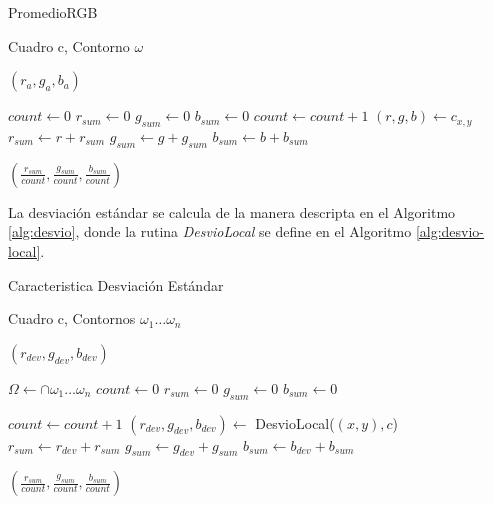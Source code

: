 \begin{algorithm}
    \caption{PromedioRGB}
    \label{alg:carac-rgb}
    \begin{algorithmic}
    \Require\hspace{\algorithmicindent}\hspace{\algorithmicindent}Cuadro c, Contorno $\omega$

    \Ensure\hspace{\algorithmicindent}\hspace{0.23cm} $(r_a, g_a, b_a)$
    \State

    \State $count \gets 0$
    \State $r_{sum} \gets 0$
    \State $g_{sum} \gets 0$
    \State $b_{sum} \gets 0$
        \State $count \gets count + 1$
        \State $(r, g, b) \gets c_{x, y}$
        \State $r_{sum} \gets r + r_{sum}$
        \State $g_{sum} \gets g + g_{sum}$
        \State $b_{sum} \gets b + b_{sum}$
    \EndFor

    \State \Return $ (\frac{r_{sum}}{count}, \frac{g_{sum}}{count}, \frac{b_{sum}}{count}) $
    \end{algorithmic}
\end{algorithm}


La desviación estándar se calcula de la manera descripta en el Algoritmo \ref{alg:desvio}, 
donde la rutina \textit{DesvioLocal} se define en el Algoritmo \ref{alg:desvio-local}.

\begin{algorithm}
    \caption{Caracteristica Desviación Estándar}
    \label{alg:desvio}
    \begin{algorithmic}
    \Require\hspace{\algorithmicindent}\hspace{\algorithmicindent}Cuadro c, Contornos $\omega_1 \dots \omega_n$

    \Ensure\hspace{\algorithmicindent}\hspace{0.23cm} $(r_{dev}, g_{dev}, b_{dev})$
    \State

    \State $\Omega \gets \cap \omega_1 \dots \omega_n$
    \State $count \gets 0$
    \State $r_{sum} \gets 0$
    \State $g_{sum} \gets 0$
    \State $b_{sum} \gets 0$

            \State $count \gets count + 1$
            \State $(r_{dev}, g_{dev}, b_{dev}) \gets $ DesvioLocal($(x, y), c$)
            \State $r_{sum} \gets r_{dev} + r_{sum}$
            \State $g_{sum} \gets g_{dev} + g_{sum}$
            \State $b_{sum} \gets b_{dev} + b_{sum}$
        \EndIf
    \EndFor

    \State \Return $ (\frac{r_{sum}}{count}, \frac{g_{sum}}{count}, \frac{b_{sum}}{count}) $
    \end{algorithmic}
\end{algorithm}

